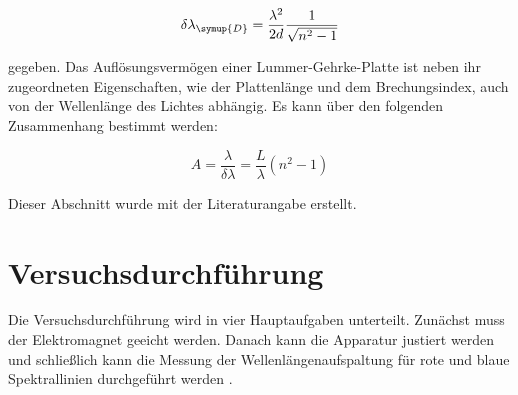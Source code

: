 \begin{equation}
    \delta \lambda_{\symup{D}} = \frac{\lambda^2}{2d} \frac{1}{\sqrt{n^2 -1}}
    \label{eq:del_Lam}
\end{equation}

gegeben. Das Auflösungsvermögen einer Lummer-Gehrke-Platte ist 
neben ihr zugeordneten Eigenschaften, wie der Plattenlänge und 
dem Brechungsindex, auch von der Wellenlänge des Lichtes 
abhängig. Es kann über den folgenden Zusammenhang bestimmt 
werden:

\begin{equation}
    A = \frac{\lambda}{\delta \lambda} = \frac{L}{\lambda}(n^2 -1)
    \label{eq:del_A}
\end{equation}

Dieser Abschnitt wurde mit der Literaturangabe \cite{sample} erstellt.

\section{Versuchsdurchführung}
\label{sec:Versuchsdurchführung}

Die Versuchsdurchführung wird in vier Hauptaufgaben unterteilt.
Zunächst muss der Elektromagnet geeicht werden. Danach kann die 
Apparatur justiert werden und schließlich kann die Messung 
der Wellenlängenaufspaltung für rote und blaue Spektrallinien 
durchgeführt werden \cite{sample}.

